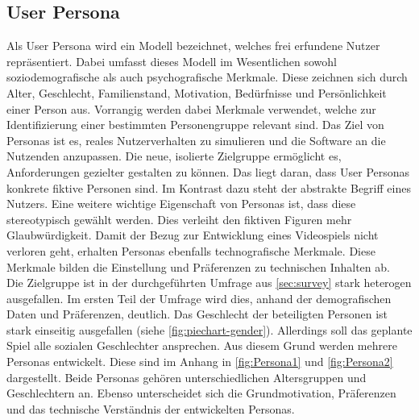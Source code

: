 \subsection{User Persona}\label{sec:persona}
Als User Persona wird ein Modell bezeichnet, welches frei erfundene Nutzer repräsentiert\cite[S.123 f]{cooper-alan}.
Dabei umfasst dieses Modell im Wesentlichen sowohl soziodemografische als auch psychografische Merkmale.
Diese zeichnen sich durch Alter, Geschlecht, Familienstand, Motivation, Bedürfnisse und Persönlichkeit einer Person aus.
Vorrangig werden dabei Merkmale verwendet, welche zur Identifizierung einer bestimmten Personengruppe relevant sind.
Das Ziel von Personas ist es, reales Nutzerverhalten zu simulieren und die Software an die Nutzenden anzupassen.
Die neue, isolierte Zielgruppe ermöglicht es, Anforderungen gezielter gestalten zu können.
Das liegt daran, dass User Personas konkrete fiktive Personen sind.
Im Kontrast dazu steht der abstrakte Begriff eines Nutzers.
Eine weitere wichtige Eigenschaft von Personas ist, dass diese stereotypisch gewählt werden.
Dies verleiht den fiktiven Figuren mehr Glaubwürdigkeit\cite[S.127 f]{cooper-alan}.
Damit der Bezug zur Entwicklung eines Videospiels nicht verloren geht, erhalten Personas ebenfalls technografische Merkmale\cite{tagungsband}.
Diese Merkmale bilden die Einstellung und Präferenzen zu technischen Inhalten ab. \\

Die Zielgruppe ist in der durchgeführten Umfrage aus \autoref{sec:survey} stark heterogen ausgefallen.
Im ersten Teil der Umfrage wird dies, anhand der demografischen Daten und Präferenzen, deutlich.
Das Geschlecht der beteiligten Personen ist stark einseitig ausgefallen (siehe \autoref{fig:piechart-gender}).
Allerdings soll das geplante Spiel alle sozialen Geschlechter ansprechen.
Aus diesem Grund werden mehrere Personas entwickelt.
Diese sind im Anhang in \autoref{fig:Persona1} und \autoref{fig:Persona2} dargestellt.
Beide Personas gehören unterschiedlichen Altersgruppen und Geschlechtern an.
Ebenso unterscheidet sich die Grundmotivation, Präferenzen und das technische Verständnis der entwickelten Personas. \\
